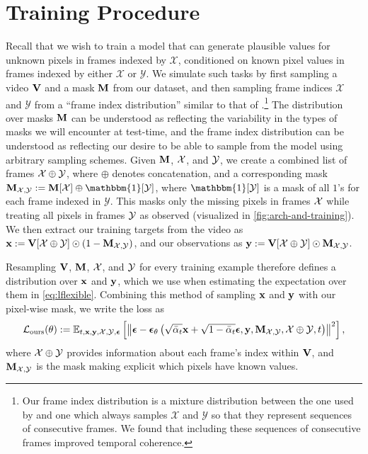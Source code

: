 \section{Training Procedure} 
Recall that we wish to train a model that can generate plausible values for unknown pixels in frames indexed by $\mathcal{X}$, conditioned on known pixel values in frames indexed by either $\mathcal{X}$ or $\mathcal{Y}$. We simulate such tasks by first sampling a video $\mathbf{V}$ and a mask $\mathbf{M}$ from our dataset,  and then sampling frame indices $\mathcal{X}$ and $\mathcal{Y}$ from a ``frame index distribution'' similar to that of \citet{fdm}.\footnote{Our frame index distribution is a mixture distribution between the one used by \citet{fdm} and one which always samples $\mathcal{X}$ and $\mathcal{Y}$ so that they represent sequences of consecutive frames. We found that including these sequences of consecutive frames improved temporal coherence.}
The distribution over masks $\mathbf{M}$ can be understood as reflecting the variability in the types of masks we will encounter at test-time, and the frame index distribution can be understood as reflecting our desire to be able to sample from the model using arbitrary sampling schemes. Given $\mathbf{M}$, $\mathcal{X}$, and $\mathcal{Y}$, we create a combined list of frames $\mathcal{X} \oplus \mathcal{Y}$, where $\oplus$ denotes concatenation, and a corresponding mask $\bM_{\fX,\fY} := \bM[\fX] \oplus \mathbbm{1}[\fY]$, where $\mathbbm{1}[\mathcal{Y}]$ is a mask of all $1$'s for each frame indexed in $\mathcal{Y}$. This masks only the missing pixels in frames $\mathcal{X}$ while treating all pixels in frames $\mathcal{Y}$ as observed (visualized in \cref{fig:arch-and-training}).
We then extract our training targets from the video as $\mathbf{x} := \mathbf{V}[\mathcal{X}\oplus\mathcal{Y}] \odot (1-\mathbf{M}_{\mathcal{X},\mathcal{Y}})$, and our observations as $\mathbf{y} := \mathbf{V}[\mathcal{X}\oplus\mathcal{Y}] \odot \mathbf{M}_{\mathcal{X},\mathcal{Y}}$.

Resampling $\mathbf{V}$, $\mathbf{M}$, $\mathcal{X}$, and $\mathcal{Y}$ for every training example therefore defines a distribution over $\mathbf{x}$ and $\mathbf{y}$, which we use when estimating the expectation over them in \cref{eq:lflexible}. Combining this method of sampling $\mathbf{x}$ and $\mathbf{y}$ with our pixel-wise mask, we write the loss as
\begin{equation}
    \mathcal{L}_{\text{ours}}(\theta):=\mathbb{E}_{t, \mathbf{x}, \mathbf{y}, \mathcal{X}, \mathcal{Y}, \boldsymbol{\epsilon}}\left[\left\|\boldsymbol{\epsilon}-\boldsymbol{\epsilon}_\theta\left(\sqrt{\bar{\alpha}_t} \mathbf{x}+\sqrt{1-\bar{\alpha}_t} \boldsymbol{\epsilon}, \mathbf{y}, \mathbf{M}_{\mathcal{X},\mathcal{Y}}, \mathcal{X}\oplus\mathcal{Y}, t\right)\right\|^2\right],
    \label{eq:lours}
\end{equation}
where $\mathcal{X}\oplus\mathcal{Y}$ provides information about each frame's index within $\mathbf{V}$, and $\mathbf{M}_{\mathcal{X},\mathcal{Y}}$ is the mask making explicit which pixels have known values.




